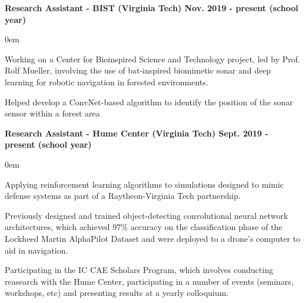 \documentclass{article}
\begin{document}
\begin{center}
\begin{flushleft}
    \textbf{Research Assistant - BIST (Virginia Tech) \hfill Nov. 2019 - present (school year)}
    \begin{compactitem}
      \itemsep0em
      \item Working on a Center for Bioinspired Science and Technology project, led by Prof. Rolf Mueller, involving the use of bat-inspired biomimetic sonar and deep learning for robotic navigation in forested environments.
      \item Helped develop a ConvNet-based algorithm to identify the position of the sonar sensor within a forest area
    \end{compactitem}

    \textbf{Research Assistant - Hume Center (Virginia Tech) \hfill Sept. 2019 - present (school year)}
    \begin{compactitem}
      \itemsep0em
      \item Applying reinforcement learning algorithms to simulations designed to mimic defense systems as part of a Raytheon-Virginia Tech partnership.
      \item Previously designed and trained object-detecting convolutional neural network architectures, which achieved 97\% accuracy on the classification phase of the Lockheed Martin AlphaPilot Dataset and were deployed to a drone's computer to aid in navigation.
      \item Participating in the IC CAE Scholars Program, which involves conducting reasearch with the Hume Center, participating in a number of events (seminars, workshops, etc) and presenting results at a yearly colloquium.
    \end{compactitem}


\end{flushleft}
\end{center}
\end{document}
